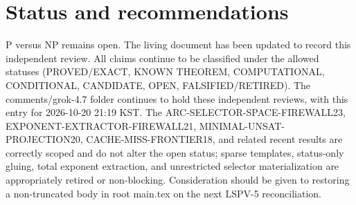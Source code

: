 \documentclass[11pt]{article}
\begin{document}
\section{Status and recommendations}
P versus NP remains open. The living document has been updated to record this independent review. All claims continue to be classified under the allowed statuses (PROVED/EXACT, KNOWN THEOREM, COMPUTATIONAL, CONDITIONAL, CANDIDATE, OPEN, FALSIFIED/RETIRED). The comments/grok-4.7 folder continues to hold these independent reviews, with this entry for 2026-10-20 21:19 KST. The ARC-SELECTOR-SPACE-FIREWALL23, EXPONENT-EXTRACTOR-FIREWALL21, MINIMAL-UNSAT-PROJECTION20, CACHE-MISS-FRONTIER18, and related recent results are correctly scoped and do not alter the open status; sparse templates, status-only gluing, total exponent extraction, and unrestricted selector materialization are appropriately retired or non-blocking. Consideration should be given to restoring a non-truncated body in root main.tex on the next LSPV-5 reconciliation.

\end{document}
